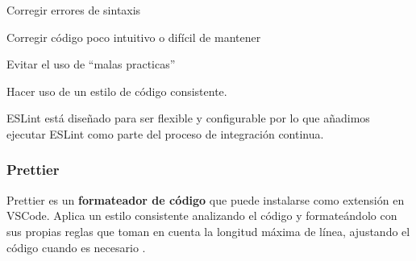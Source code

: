 \documentclass[12pt,twoside,titlepage]{report}
\begin{document}
\begin{compactitem}
 \item Corregir errores de sintaxis
 \item Corregir código poco intuitivo o difícil de mantener
 \item Evitar el uso de ``malas practicas''
 \item Hacer uso de un estilo de código consistente.
\end{compactitem}

ESLint está diseñado para ser flexible y configurable por lo que añadimos ejecutar ESLint como parte del proceso de integración continua.

\subsubsection{Prettier}

Prettier es un \textbf{formateador de código} que puede instalarse como extensión en VSCode. Aplica un estilo consistente analizando el código y formateándolo con sus propias reglas que toman en cuenta la longitud máxima de línea, ajustando el código cuando es necesario \cite{prettier}.

\end{document}
